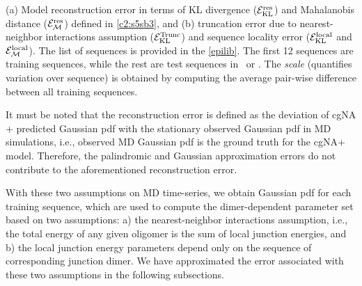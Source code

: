 \begin{table}[H]
\begin{subtable}[h]{1.0\textwidth}
\end{subtable}
\centering\caption{
(a) Model reconstruction error in terms of KL divergence (${\mathcal E}_{\text{KL}}^{\text{res}}$) and Mahalanobis distance (${\mathcal E}_{\mathcal{M}}^{\text{res}}$) defined in \cref{c2:s5sb3}, and 
(b) truncation error due to nearest-neighbor interactions assumption (${\mathcal E}_{\text{KL}}^{\text{Trunc}}$) and sequence locality error (${\mathcal E}_{\text{KL}}^{\text{local}}$ and ${\mathcal E}_{\mathcal{M}}^{\text{local}}$). 
The list of sequences is provided in the \cref{epilib}. 
The first 12 sequences are training sequences, while the rest are test sequences in \Lbm \ or \Lbh.
The \textit{scale} (quantifies variation over sequence) is obtained by computing the average pair-wise difference between all training sequences.
}
\label{c6:tab2_errors}
\end{table}


It must be noted that the reconstruction error is defined as the deviation of cgNA$+$ predicted Gaussian pdf with the stationary observed Gaussian pdf in MD simulations, i.e., observed MD Gaussian pdf is the ground truth for the cgNA$+$ model. 
Therefore, the palindromic and Gaussian approximation errors do not contribute to the aforementioned reconstruction error.

With these two assumptions on MD time-series, we obtain Gaussian pdf for each training sequence, which are used to compute the dimer-dependent parameter set based on two assumptions: a) the nearest-neighbor interactions assumption, i.e., the total energy of any given oligomer is the sum of local junction energies, and b) the local junction energy parameters depend only on the sequence of corresponding junction dimer.
We have approximated the error associated with these two assumptions in the following subsections.

